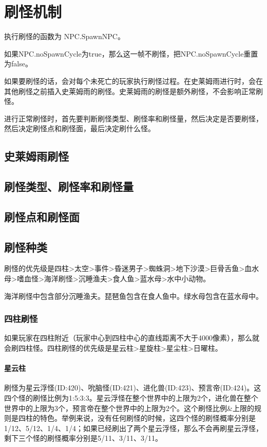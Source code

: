\chapter{刷怪机制}
执行刷怪的函数为 NPC.SpawnNPC。

如果NPC.noSpawnCycle为true，那么这一帧不刷怪，把NPC.noSpawnCycle重置为false。

如果要刷怪的话，会对每个未死亡的玩家执行刷怪过程。在史莱姆雨进行时，会在其他刷怪之前插入史莱姆雨的刷怪。史莱姆雨的刷怪是额外刷怪，不会影响正常刷怪。

进行正常刷怪时，首先要判断刷怪类型、刷怪率和刷怪量，然后决定是否要刷怪，然后决定刷怪点和刷怪面，最后决定刷什么怪。

\section{史莱姆雨刷怪}

\section{刷怪类型、刷怪率和刷怪量}

\section{刷怪点和刷怪面}

\section{刷怪种类}
刷怪的优先级是四柱>太空>事件>昏迷男子>蜘蛛洞>地下沙漠>巨骨舌鱼>血水母>嗜血怪>海洋刷怪>沉睡渔夫>食人鱼>蓝水母>水中小动物。

海洋刷怪中包含部分沉睡渔夫。琵琶鱼包含在食人鱼中。绿水母包含在蓝水母中。

\subsection{四柱刷怪}
如果玩家在四柱附近（玩家中心到四柱中心的直线距离不大于4000像素），那么就会刷四柱怪。四柱刷怪的优先级是星云柱>星旋柱>星尘柱>日曜柱。

\subsubsection{星云柱}
刷怪为星云浮怪(ID:420)、吮脑怪(ID:421)、进化兽(ID:423)、预言帝(ID:424)。这四个怪的刷怪比例为1:5:3:3。星云浮怪在整个世界中的上限为2个，进化兽在整个世界中的上限为3个，预言帝在整个世界中的上限为2个。这个刷怪比例\&上限的规则是四柱的特色。举例来说，没有任何刷怪的时候，这四个怪的刷怪概率分别是1/12、5/12、1/4、1/4；如果已经刷出了两个星云浮怪，那么不会再刷星云浮怪，剩下三个怪的刷怪概率分别是5/11、3/11、3/11。

